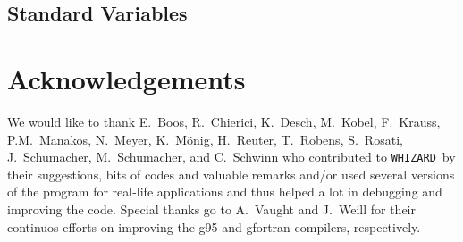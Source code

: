 \documentclass[12pt]{book}
\newcommand{\ttt}[1]{\texttt{#1}}
\newcommand{\whizard}{\ttt{WHIZARD}}
\begin{document}
\subsection{Standard Variables}
\begin{itemize}

\end{itemize}

\clearpage
\section*{Acknowledgements}

We would like to thank E.~Boos, R.~Chierici, K.~Desch, M.~Kobel,
F.~Krauss, P.M.~Manakos, N.~Meyer, K.~M\"onig, H.~Reuter, T.~Robens,
S.~Rosati, J.~Schumacher, M.~Schumacher, and C.~Schwinn who
contributed to \whizard\ by their suggestions, bits of codes and
valuable remarks and/or used several versions of the program for
real-life applications and thus helped a lot in debugging and
improving the code.  Special thanks go to A.~Vaught and J.~Weill for
their continuos efforts on improving the g95 and gfortran compilers,
respectively.
\end{document}
